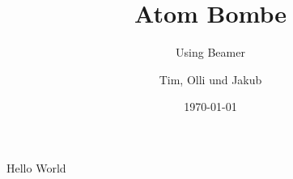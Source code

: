 \documentclass{beamer}
\title{Atom Bombe}
\subtitle{Using Beamer}
\author{Tim, Olli und Jakub}
\institute{Kanti Baden}
\date{\today}
\begin{document}
    Hello World
\end{document}
